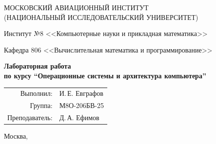 \hypersetup{pageanchor=false}
\begin{titlepage}
\begin{center}
\large
МОСКОВСКИЙ АВИАЦИОННЫЙ ИНСТИТУТ\\ (НАЦИОНАЛЬНЫЙ ИССЛЕДОВАТЕЛЬСКИЙ УНИВЕРСИТЕТ)

\vspace{20pt}

Институт №8 <<Компьютерные науки и прикладная математика>>

Кафедра 806 <<Вычислительная математика и программирование>>
\end{center}

\vspace{60pt}

\begin{center}
\bfseries
\large
Лабораторная работа  \\по курсу \enquote{Операционные системы и архитектура компьютера}

\vspace{54pt}

\end{center}

\vfill

\begin{flushright}
\large
\begin{tabular}{rl}
Выполнил: & И.\,Е. Евграфов \\
Группа: & М8О-206БВ-25 \\
Преподаватель: & Д.\,А. Ефимов \\
\end{tabular}
\end{flushright}

\vspace{92pt}

\begin{center}
\large
Москва, \the\year
\end{center}
\end{titlepage}
\hypersetup{pageanchor=true}

\pagebreak
